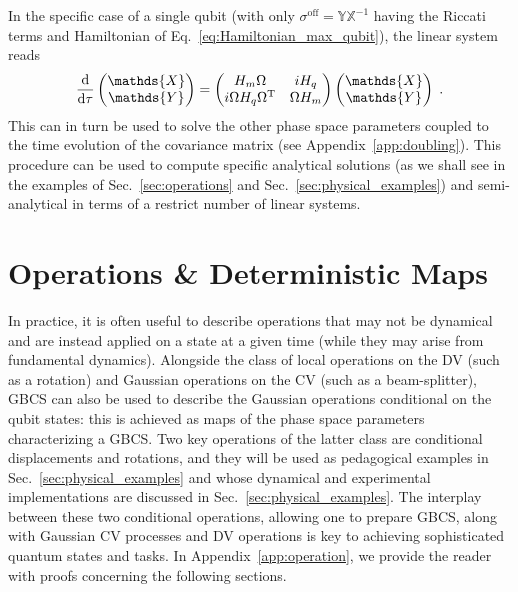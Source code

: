 \documentclass[%
reprint,
superscriptaddress,
nofootinbib,
 amsmath,amssymb,
prx,
floatfix,
]{revtex4-2}
\begin{document}
In the specific case of a single qubit (with only $\sigma^{\text{off}} = \mathds{Y} \mathds{X}^{-1}$ having the Riccati terms and Hamiltonian of Eq.~\ref{eq:Hamiltonian_max_qubit}), the linear system reads 
\begin{equation}
    \frac{\text{d}}{\text{d} \tau}\begin{pmatrix}
        \mathds{X} \\
        \mathds{Y}
    \end{pmatrix} =
    \begin{pmatrix}
           H_m \Omega &     i  H_q \\
          i \Omega H_q \Omega^{\rm T}  & \Omega H_m 
    \end{pmatrix}\begin{pmatrix}
        \mathds{X} \\
        \mathds{Y}
    \end{pmatrix}  \;.
\end{equation}
This can in turn be used to solve the other phase space parameters coupled to the time evolution of the covariance matrix (see Appendix~\ref{app:doubling}). This procedure can be used to compute specific analytical solutions (as we shall see in the examples of Sec.~\ref{sec:operations} and Sec.~\ref{sec:physical_examples}) and semi-analytical in terms of a restrict number of linear systems. 

\section{Operations \& Deterministic Maps \label{sec:operations}}

In practice, it is often useful to describe operations that may not be dynamical and are instead applied on a state at a given time (while they may arise from fundamental dynamics). Alongside the class of local operations on the DV (such as a rotation) and Gaussian operations on the CV (such as a beam-splitter), GBCS can also be used to describe the Gaussian operations conditional on the qubit states: this is achieved as maps of the phase space parameters characterizing a GBCS. Two key operations of the latter class are conditional displacements and rotations, and they will be used as pedagogical examples in Sec.~\ref{sec:physical_examples} and whose dynamical and experimental implementations are discussed in Sec.~\ref{sec:physical_examples}. The interplay between these two conditional operations, allowing one to prepare GBCS, along with Gaussian CV processes and DV operations is key to achieving sophisticated quantum states and tasks. In Appendix~\ref{app:operation}, we provide the reader with proofs concerning the following sections.
\end{document}
